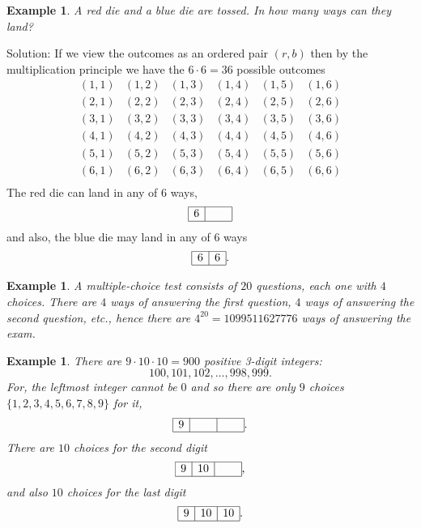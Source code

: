 \documentclass[11pt, openany]{book}
\theoremstyle{change} \theoremheaderfont{\blue\sffamily\bfseries}
\newtheorem{exa}[thm]{Example}
\theoremstyle{nonumberplain} \theoremheaderfont{\sffamily\bfseries}
\newcommand{\í}{\'{\i}}
\begin{document}
\begin{exa}
A red die and a blue die are tossed. In how many ways can they land?
\end{exa}
Solution: If we view the outcomes as an ordered pair $(r, b)$ then
by the multiplication principle we have the $6\cdot 6 = 36$ possible
outcomes
$$\begin{array}{llllll} (1,1) & (1,2) & (1,3) & (1,4) & (1,5) & (1,6) \\
(2,1) & (2,2) & (2,3) & (2,4) & (2,5) & (2,6) \\
(3,1) & (3,2) & (3,3) & (3,4) & (3,5) & (3,6) \\
(4,1) & (4,2) & (4,3) & (4,4) & (4,5) & (4,6) \\
(5,1) & (5,2) & (5,3) & (5,4) & (5,5) & (5,6) \\
(6,1) & (6,2) & (6,3) & (6,4) & (6,5) & (6,6) \\  \end{array} $$
The red die can land in any of $6$ ways, $$\begin{array}{|c|c|}\hline 6  & \hspace{.5cm}  \\
\hline
\end{array}  $$
and also, the blue die may land in any of $6$ ways
$$\begin{array}{|c|c|}\hline 6  & 6  \\ \hline \end{array}.  $$
\begin{exa}
A multiple-choice test consists of $20$ questions, each one with $4$
choices. There are $4$ ways of answering the first question, $4$
ways of answering the second question, etc., hence there are $4^{20}
= 1099511627776$ ways of answering the exam.
\end{exa}


\begin{exa}\label{exa:3_digit_integers}
There are $9\cdot 10\cdot 10 =900$ positive 3-digit integers:
$$100, 101, 102, \ldots , 998, 999.        $$
For, the leftmost integer cannot be $0$ and so there are only $9$
choices $\{1,2,3,4,5,6,7,8,9\}$ for it,
$$\begin{array}{|c|c|c|}\hline 9  & \hspace{.5cm} & \hspace{.5cm}  \\ \hline \end{array}.  $$
There are $10$ choices for the second digit
$$\begin{array}{|c|c|c|}\hline 9  & 10 & \hspace{.5cm}  \\ \hline \end{array},  $$
and also $10$ choices for the last digit
$$\begin{array}{|c|c|c|}\hline 9  & 10 & 10  \\ \hline \end{array}.  $$
\end{exa}
\end{document}
